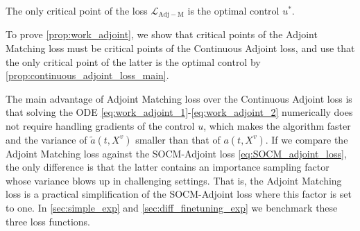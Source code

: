 \documentclass[]{fairmeta}
\begin{document}
\begin{proposition} \label{prop:work_adjoint}
    The only critical point of the loss $\mathcal{L}_{\mathrm{Adj-M}}$ is the optimal control $u^*$.
\end{proposition}
To prove \autoref{prop:work_adjoint}, we show that critical points of the Adjoint Matching loss must be critical points of the Continuous Adjoint loss, and use that the only critical point of the latter is the optimal control by \autoref{prop:continuous_adjoint_loss_main}. 

The main advantage of Adjoint Matching loss over the Continuous Adjoint loss is that solving the ODE \eqref{eq:work_adjoint_1}-\eqref{eq:work_adjoint_2} numerically does not require handling gradients of the control $u$, which makes the algorithm faster and the variance of $\tilde{a}(t,X^v)$ smaller than that of $a(t,X^v)$. If we compare the Adjoint Matching loss against the SOCM-Adjoint loss \eqref{eq:SOCM_adjoint_loss}, the only difference is that the latter contains an importance sampling factor whose variance blows up in challenging settings. That is, the Adjoint Matching loss is a practical simplification of the SOCM-Adjoint loss where this factor is set to one.
In \autoref{sec:simple_exp} and \autoref{sec:diff_finetuning_exp} we benchmark these three loss functions.  
\end{document}
